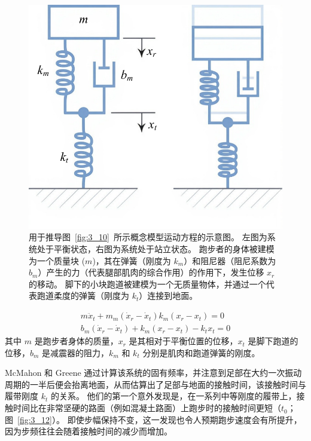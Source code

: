 \begin{figure}[!htb]
	\centering
	\includegraphics[width=0.4\linewidth]{chap3/3_11}
	\caption{用于推导图~\ref{fig:3_10}~所示概念模型运动方程的示意图。
		左图为系统处于平衡状态，右图为系统处于站立状态。
		跑步者的身体被建模为一个质量块 ($m$)，其在弹簧（刚度为 $k_m$）和阻尼器（阻尼系数为 $b_m$）产生的力（代表腿部肌肉的综合作用）的作用下，发生位移 $x_r$ 的移动。
		脚下的小块跑道被建模为一个无质量物体，并通过一个代表跑道柔度的弹簧（刚度为 $k_t$）连接到地面\cite{mcmahon1979influence}。 \label{fig:3_11}}
\end{figure}

\begin{equation}
\begin{aligned}
	m \ddot{x}_t + 
	m_m ( \dot{x}_r - \dot{x}_t )
	k_m ( x_r - x_t ) = 0 \\
	b_m ( \dot{x}_r - \dot{x}_t )
	+ k_m ( x_r - x_t ) 
	- k_t x_t = 0
\end{aligned}
\end{equation}
% 
其中 $m$ 是跑步者身体的质量，$x_r$ 是其相对于平衡位置的位移，$x_t$ 是脚下跑道的位移，$b_m$ 是减震器的阻力，$k_m$ 和 $k_t$ 分别是肌肉和跑道弹簧的刚度。


McMahon 和 Greene 通过计算该系统的固有频率，并注意到足部在大约一次振动周期的一半后便会抬离地面，从而估算出了足部与地面的接触时间，该接触时间与履带刚度 $k_t$ 的关系。
他们的第一个意外发现是，在一系列中等刚度的履带上，接触时间比在非常坚硬的路面（例如混凝土路面）上跑步时的接触时间更短（$t_0$；图~\ref{fig:3_12}）。
即使步幅保持不变，这一发现也令人预期跑步速度会有所提升，因为步频往往会随着接触时间的减少而增加。

